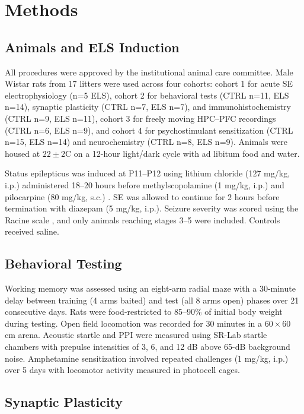 \documentclass[11pt]{article}
\begin{document}
\section{Methods}

\subsection{Animals and ELS Induction}

All procedures were approved by the institutional animal care committee. Male Wistar rats from 17 litters were used across four cohorts: cohort 1 for acute SE electrophysiology (n=5 ELS), cohort 2 for behavioral tests (CTRL n=11, ELS n=14), synaptic plasticity (CTRL n=7, ELS n=7), and immunohistochemistry (CTRL n=9, ELS n=11), cohort 3 for freely moving HPC--PFC recordings (CTRL n=6, ELS n=9), and cohort 4 for psychostimulant sensitization (CTRL n=15, ELS n=14) and neurochemistry (CTRL n=8, ELS n=9). Animals were housed at $22 \pm 2$\textdegree{}C on a 12-hour light/dark cycle with ad libitum food and water.

Status epilepticus was induced at P11--P12 using lithium chloride (127 mg/kg, i.p.) administered 18--20 hours before methylscopolamine (1 mg/kg, i.p.) and pilocarpine (80 mg/kg, s.c.) \citep{curia2008pilocarpine}. SE was allowed to continue for 2 hours before termination with diazepam (5 mg/kg, i.p.). Seizure severity was scored using the Racine scale \citep{racine1972modification}, and only animals reaching stages 3--5 were included. Controls received saline.

\subsection{Behavioral Testing}

Working memory was assessed using an eight-arm radial maze with a 30-minute delay between training (4 arms baited) and test (all 8 arms open) phases over 21 consecutive days. Rats were food-restricted to 85--90\% of initial body weight during testing. Open field locomotion was recorded for 30 minutes in a $60 \times 60$ cm arena. Acoustic startle and PPI were measured using SR-Lab startle chambers with prepulse intensities of 3, 6, and 12 dB above 65-dB background noise. Amphetamine sensitization involved repeated challenges (1 mg/kg, i.p.) over 5 days with locomotor activity measured in photocell cages.

\subsection{Synaptic Plasticity}
\end{document}
